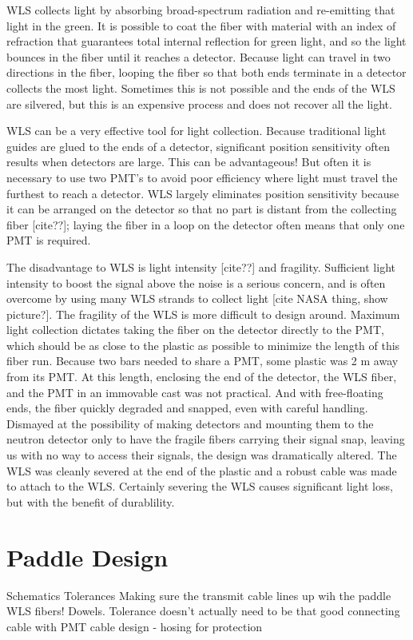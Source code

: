 WLS collects light by absorbing broad-spectrum radiation and re-emitting that light in the green.  It is possible to coat the fiber with material with an index of refraction that guarantees total internal reflection for green light, and so the light bounces in the fiber until it reaches a detector.  Because light can travel in two directions in the fiber, looping the fiber so that both ends terminate in a detector collects the most light.  Sometimes this is not possible and the ends of the WLS are silvered, but this is an expensive process and does not recover all the light. 

WLS can be a very effective tool for light collection.  Because traditional light guides are glued to the ends of a detector, significant position sensitivity often results when detectors are large.  This can be advantageous!  But often it is necessary to use two PMT's to avoid poor efficiency where light must travel the furthest to reach a detector.  WLS largely eliminates position sensitivity because it can be arranged on the detector so that no part is distant from the collecting fiber [cite??]; laying the fiber in a loop on the detector often means that only one PMT is required.

The disadvantage to WLS is light intensity [cite??] and fragility.  Sufficient light intensity to boost the signal above the noise is a serious concern, and is often overcome by using many WLS strands to collect light [cite NASA thing, show picture?].  The fragility of the WLS is more difficult to design around.  Maximum light collection dictates taking the fiber on the detector directly to the PMT, which should be as close to the plastic as possible to minimize the length of this fiber run.  Because two bars needed to share a PMT, some plastic was 2 m away from its PMT.  At this length, enclosing the end of the detector, the WLS fiber, and the PMT in an immovable cast was not practical.  And with free-floating ends, the fiber quickly degraded and snapped, even with careful handling.  Dismayed at the possibility of making detectors and mounting them to the neutron detector only to have the fragile fibers carrying their signal snap, leaving us with no way to access their signals, the design was dramatically altered.  The WLS was cleanly severed at the end of the plastic and a robust cable was made to attach to the WLS.  Certainly severing the WLS causes significant light loss, but with the benefit of durablility.  

\section{Paddle Design}
Schematics
Tolerances
Making sure the transmit cable lines up wih the paddle WLS fibers!  Dowels.  Tolerance doesn't actually need to be that good
connecting cable with PMT
cable design - hosing for protection

